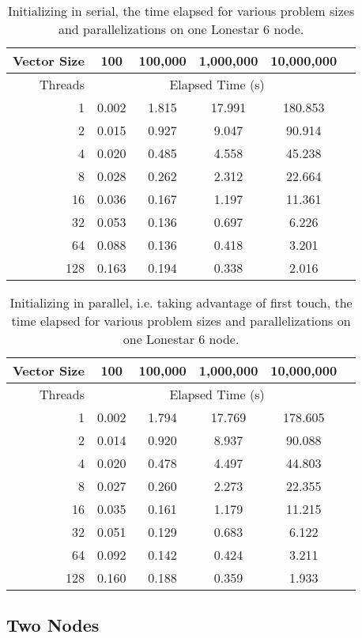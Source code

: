 \documentclass{article}
\begin{document}
\begin{table}[h!]
	\centering
	\caption{Initializing in serial, the time elapsed for various problem sizes and parallelizations on one Lonestar 6 node.}
	\label{tbl:serial-init}
	\begin{tabular}{r|ccccc}
		Vector Size & 100 & 100,000 & 1,000,000 & 10,000,000 \\
		\hline
		Threads & \multicolumn{4}{c}{Elapsed Time (s)} \\
		\hline
		1 & 0.002 & 1.815 & 17.991 & 180.853 \\
		2 & 0.015 & 0.927 & 9.047 & 90.914 \\
		4 & 0.020 & 0.485 & 4.558 & 45.238 \\
		8 & 0.028 & 0.262 & 2.312 & 22.664 \\
		16 & 0.036 & 0.167 & 1.197 & 11.361 \\
		32 & 0.053 & 0.136 & 0.697 & 6.226 \\
		64 & 0.088 & 0.136 & 0.418 & 3.201 \\
		128 & 0.163 & 0.194 & 0.338 & 2.016
	\end{tabular}
\end{table}

\begin{table}[h!]
	\centering
	\caption{Initializing in parallel, i.e. taking advantage of first touch, the time elapsed for various problem sizes and parallelizations on one Lonestar 6 node.}
	\label{tbl:parallel-init}
	\begin{tabular}{r|ccccc}
		Vector Size & 100 & 100,000 & 1,000,000 & 10,000,000 \\
		\hline
		Threads & \multicolumn{4}{c}{Elapsed Time (s)} \\
		\hline
		1 & 0.002 & 1.794 & 17.769 & 178.605 \\
		2 & 0.014 & 0.920 & 8.937 & 90.088 \\
		4 & 0.020 & 0.478 & 4.497 & 44.803 \\
		8 & 0.027 & 0.260 & 2.273 & 22.355 \\
		16 & 0.035 & 0.161 & 1.179 & 11.215 \\
		32 & 0.051 & 0.129 & 0.683 & 6.122 \\
		64 & 0.092 & 0.142 & 0.424 & 3.211 \\
		128 & 0.160 & 0.188 & 0.359 & 1.933
	\end{tabular}
\end{table}

\subsection{Two Nodes}
\end{document}
